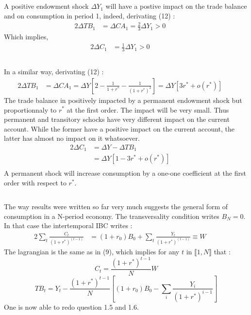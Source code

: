 \documentclass{article}
\begin{document}
\subsection{}
A positive endowment shock $\Delta Y_1$ will have a postive impact on the trade balance and on consumption in period 1, indeed, derivating (12) :
\begin{alignat}{2}
    \Delta TB_1 &= \Delta CA_1 = \frac{2}{3} \Delta Y_1  > 0 \quad&
\end{alignat}
Which implies,
\begin{alignat}{2}
    \Delta C_1 &= \frac{1}{3} \Delta Y_1  > 0 \quad&
\end{alignat}
\subsection{}
In a similar way, derivating (12) :
\begin{alignat}{2}
    \Delta TB_1 &= \Delta CA_1 = \Delta Y \left[2 - \frac{1}{1+r^*} - \frac{1}{(1+r^*)^2} \right] = \Delta Y \left[3 r^* + o(r^*)\right]\quad&
\end{alignat}
The trade balance in positively impacted by a permanent endowment shock but proportionnaly to $r^*$ at the first order. The impact will be very small.\newline
Thus permanent and transitory schocks have very different impact on the current account. While the former have a positive impact on the current account, the latter has almost no impact on it whatsoever. 
\begin{alignat*}{2}
    \Delta C_1 &= \Delta Y - \Delta TB_1 \quad&\\
    &= \Delta Y \left[1 - 3 r^* + o(r^*)\right]\quad&\\
\end{alignat*}
A permanent shock will increase consumption by a one-one coefficient at the first order with respect to $r^*$. 
\subsection{}
The way results were written so far very much suggests the general form of consumption in a N-period economy. The transversality condition writes $B_N = 0$.
In that case the intertemporal IBC writes :
\begin{alignat}{2}
    \sum_{t} \frac{C_t}{(1+r^*)^{(t-1)}} &= (1+r_0)B_0 + \sum_t \frac{Y_t}{(1+r^*)^{(t-1)}} \equiv W \quad&
\end{alignat}
The lagrangian is the same as in (9), which implies for any $t$ in $\llbracket 1, N \rrbracket$  that :
\begin{equation}{}
    C_t = \frac{(1+r^*)^{t-1}}{N}W 
\end{equation}
\begin{equation}{}
    TB_t = Y_t - \frac{(1+r^*)^{t-1}}{N} \left[ (1+r_0)B_0 - \sum_i \frac{Y_i}{(1+r^*)^{i-1}} \right]
    \label{tb_t}
\end{equation}
One is now able to redo question 1.5 and 1.6.\newline
\end{document}
